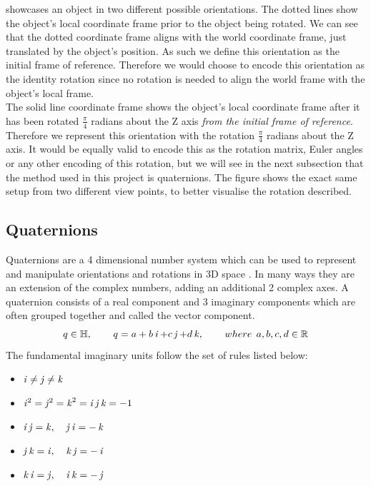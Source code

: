 
 showcases an object in two different possible orientations. The dotted lines show the object's local coordinate frame prior to the object being rotated. We can see that the dotted coordinate frame aligns with the world coordinate frame, just translated by the object's position. As such we define this orientation as the initial frame of reference. Therefore we would choose to encode this orientation as the identity rotation since no rotation is needed to align the world frame with the object's local frame.\\

The solid line coordinate frame shows the object's local coordinate frame after it has been rotated $\frac{\pi}{4}$ radians about the Z axis \textit{from the initial frame of reference}. Therefore we represent this orientation with the rotation $\frac{\pi}{4}$ radians about the Z axis. It would be equally valid to encode this as the rotation matrix, Euler angles or any other encoding of this rotation, but we will see in the next subsection that the method used in this project is quaternions. The figure shows the exact same setup from two different view points, to better visualise the rotation described.

\subsection{Quaternions}
\label{subsec:quaternions}
Quaternions are a 4 dimensional number system \cite{quaternions} which can be used to represent and manipulate orientations and rotations in 3D space \cite{orientations}. In many ways they are an extension of the complex numbers, adding an additional 2 complex axes. A quaternion consists of a real component and 3 imaginary components which are often grouped together and called the vector component.
$$q \in \operatorname{\mathbb{H}}, \operatorname{\operatorname{\: \: \: \:} \operatorname{\: \: \: \:}} q = a + b\operatorname{\mathit{i}} + c\operatorname{\mathit{j}} + d\operatorname{\mathit{k}}, \operatorname{\operatorname{\: \: \: \:} \operatorname{\: \: \: \:}} where \: \: a,b,c,d \in \operatorname{\mathbb{R}}$$
The fundamental imaginary units follow the set of rules listed below:
\begin{itemize}
    \item $\operatorname{\mathit{i}} \neq \operatorname{\mathit{j}} \neq \operatorname{\mathit{k}}$
    \item $\operatorname{\mathit{i}}^2 = \operatorname{\mathit{j}}^2 = \operatorname{\mathit{k}}^2 = \operatorname{\mathit{i}}\operatorname{\mathit{j}}\operatorname{\mathit{k}} = -1$
    \item $\operatorname{\mathit{i}}\operatorname{\mathit{j}} = \operatorname{\mathit{k}}, \operatorname{\: \: \: \:} \operatorname{\mathit{j}}\operatorname{\mathit{i}} = -\operatorname{\mathit{k}}$
    \item $\operatorname{\mathit{j}}\operatorname{\mathit{k}} = \operatorname{\mathit{i}}, \operatorname{\: \: \: \:} \operatorname{\mathit{k}}\operatorname{\mathit{j}} = -\operatorname{\mathit{i}}$
    \item $\operatorname{\mathit{k}}\operatorname{\mathit{i}} = \operatorname{\mathit{j}}, \operatorname{\: \: \: \:} \operatorname{\mathit{i}}\operatorname{\mathit{k}} = -\operatorname{\mathit{j}}$
\end{itemize}

